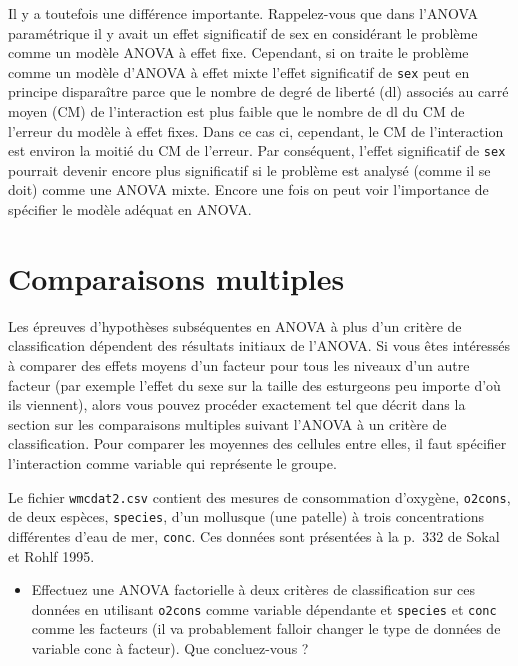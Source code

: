 \documentclass[
  12pt,
]{book}
\providecommand{\tightlist}{%
  \setlength{\itemsep}{0pt}\setlength{\parskip}{0pt}}
\begin{document}
Il y a toutefois une différence importante. Rappelez-vous que dans l'ANOVA paramétrique il y avait un effet significatif de sex en considérant le problème comme un modèle ANOVA à effet fixe. Cependant, si on traite le problème comme un modèle d'ANOVA à effet mixte l'effet significatif de \texttt{sex} peut en principe disparaître parce que le nombre de degré de liberté (dl) associés au carré moyen (CM) de l'interaction est plus faible que le nombre de dl du CM de l'erreur du modèle à effet fixes. Dans ce cas ci, cependant, le CM de l'interaction est environ la moitié du CM de l'erreur. Par conséquent, l'effet significatif de \texttt{sex} pourrait devenir encore plus significatif si le problème est analysé (comme il se doit) comme une ANOVA mixte. Encore une fois on peut voir l'importance de spécifier le modèle adéquat en ANOVA.

\hypertarget{comparaisons-multiples}{%
\section{Comparaisons multiples}\label{comparaisons-multiples}}

Les épreuves d'hypothèses subséquentes en ANOVA à plus d'un critère de classification dépendent des résultats initiaux de l'ANOVA. Si vous êtes intéressés à comparer des effets moyens d'un facteur pour tous les niveaux d'un autre facteur (par exemple l'effet du sexe sur la taille des esturgeons peu importe d'où ils viennent), alors vous pouvez procéder exactement tel que décrit dans la section sur les comparaisons multiples suivant l'ANOVA à un critère de classification. Pour comparer les moyennes des cellules entre elles, il faut spécifier l'interaction comme variable qui représente le groupe.

Le fichier \texttt{wmcdat2.csv} contient des mesures de consommation d'oxygène, \texttt{o2cons}, de deux espèces, \texttt{species}, d'un mollusque (une patelle) à trois concentrations différentes d'eau de mer, \texttt{conc}. Ces données sont présentées à la p.~332 de Sokal et Rohlf 1995.

\begin{itemize}
\tightlist
\item
  Effectuez une ANOVA factorielle à deux critères de classification sur ces données en utilisant \texttt{o2cons} comme variable dépendante et \texttt{species} et \texttt{conc} comme les facteurs (il va probablement falloir changer le type de données de variable conc à facteur). Que concluez-vous ?
\end{itemize}
\end{document}
